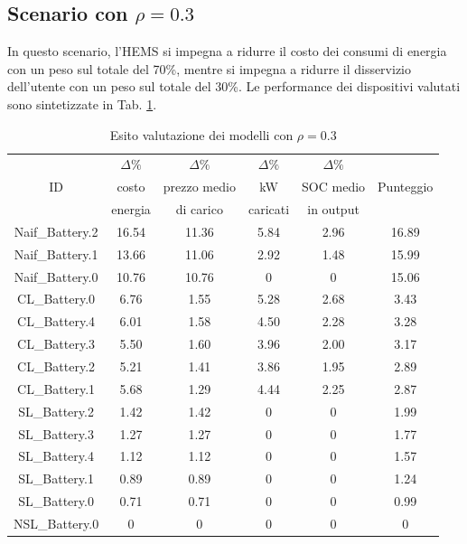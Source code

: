 \documentclass[italian, Lau, oneside]{sapthesis}
\begin{document}
\subsection{Scenario con $\rho = 0.3$}
In questo scenario, l'HEMS si impegna a ridurre il costo dei consumi di energia con un peso sul totale del 70\%, mentre si impegna a ridurre il disservizio dell'utente con un peso sul totale del 30\%. Le performance dei dispositivi valutati sono sintetizzate in Tab. \ref{tab:scen1}.
\begin{table}[h]
    \center
    \caption{Esito valutazione dei modelli con $\rho = 0.3$}
    \label{tab:scen1}
    \begin{tabular}{c|c|c|c|c|c}
        \hline
        \hline
                & $\Delta \%$   & $\Delta \%$   & $\Delta \%$   & $\Delta \%$   &\\
        ID      & costo         & prezzo medio  & kW            & SOC medio     & Punteggio\\
                & energia       & di carico     & caricati      & in output     & \\

        \hline
        Naif\_Battery.2     & 16.54     & 11.36     & 5.84  & 2.96  & 16.89     \\
        \hline
        Naif\_Battery.1     & 13.66     & 11.06     & 2.92  & 1.48  & 15.99     \\
        \hline
        Naif\_Battery.0     & 10.76     & 10.76     & 0     & 0     & 15.06     \\
        \hline
        CL\_Battery.0       & 6.76      & 1.55      & 5.28  & 2.68  & 3.43      \\
        \hline
        CL\_Battery.4       & 6.01      & 1.58      & 4.50  & 2.28  & 3.28      \\
        \hline
        CL\_Battery.3       & 5.50      & 1.60      & 3.96  & 2.00  & 3.17      \\
        \hline
        CL\_Battery.2       & 5.21      & 1.41      & 3.86  & 1.95  & 2.89      \\
        \hline
        CL\_Battery.1       & 5.68      & 1.29      & 4.44  & 2.25  & 2.87      \\
        \hline
        SL\_Battery.2       & 1.42      & 1.42      & 0     & 0     & 1.99      \\
        \hline
        SL\_Battery.3       & 1.27      & 1.27      & 0     & 0     & 1.77      \\
        \hline
        SL\_Battery.4       & 1.12      & 1.12      & 0     & 0     & 1.57      \\
        \hline
        SL\_Battery.1       & 0.89      & 0.89      & 0     & 0     & 1.24      \\
        \hline
        SL\_Battery.0       & 0.71      & 0.71      & 0     & 0     & 0.99      \\
        \hline
        NSL\_Battery.0      & 0         & 0         & 0     & 0     & 0         \\
        \hline
        \hline
    \end{tabular}
\end{table}
\end{document}
